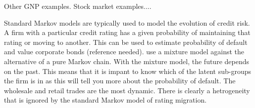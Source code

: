 \documentclass[12pt, a4paper, oneside]{article} %
\begin{document}
Other GNP examples.  Stock market examples....

Standard Markov models are typically used to model the evolution of credit risk.  A firm with a particular credit rating has a given probability of maintaining that rating or moving to another.  This can be used to estimate probability of default and value corporate bonds (reference needed).  \citet{frydman2008credit} use a mixture model against the alternative of a pure Markov chain. With the mixture model, the future depends on the past.  This means that it is impant to know which of the latent sub-groups the firm is in as this will tell you more about the probability of default.  The wholesale and retail trades are the most dynamic. There is clearly a hetrogeneity that is ignored by the standard Markov model of rating migration. 






\end{document}
